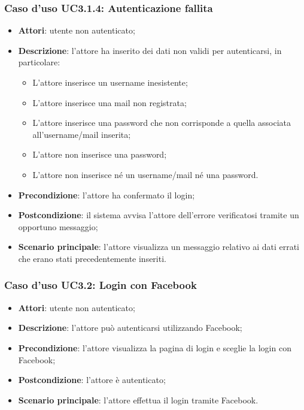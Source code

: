 \subsubsection{Caso d'uso UC3.1.4: Autenticazione fallita}
\begin{itemize}
	\item \textbf{Attori}: utente non autenticato;
	\item \textbf{Descrizione}: l'attore ha inserito dei dati non validi per autenticarsi, in particolare:
		\begin{itemize}
		\item L'attore inserisce un username inesistente;
		\item L'attore inserisce una mail non registrata;
		\item L'attore inserisce una password che non corrisponde a quella associata all'username/mail inserita;
		\item L'attore non inserisce una password;
		\item L'attore non inserisce né un username/mail né una password.
		\end{itemize}
	\item \textbf{Precondizione}: l'attore ha confermato il login;
	\item \textbf{Postcondizione}: il sistema avvisa l'attore dell'errore verificatosi tramite un opportuno messaggio;
	\item \textbf{Scenario principale}: l'attore visualizza un messaggio relativo ai dati errati che erano stati precedentemente inseriti.	
\end{itemize}

\subsubsection{Caso d'uso UC3.2: Login con Facebook}
\begin{itemize}
	\item \textbf{Attori}: utente non autenticato;
	\item \textbf{Descrizione}: l'attore può autenticarsi utilizzando Facebook;
	\item \textbf{Precondizione}: l'attore visualizza la pagina di login e sceglie la login con Facebook;
	\item \textbf{Postcondizione}: l'attore è autenticato;
	\item \textbf{Scenario principale}: l'attore effettua il login tramite Facebook.
\end{itemize}
